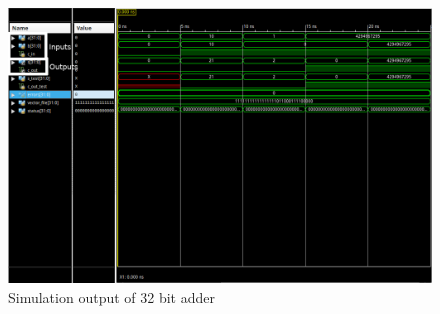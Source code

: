 \documentclass{article}
\begin{document}
    \begin{figure}[H]
        \centering
        \includegraphics[width=0.9\paperwidth,center]{Screenshots/adder_32.png}
        \caption{Simulation output of 32 bit adder}
    \end{figure}
\end{document}
